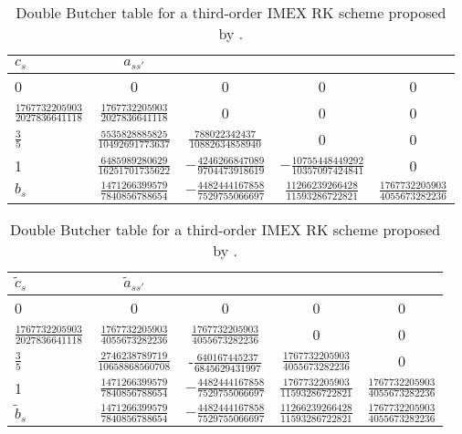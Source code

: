 \begin{table}[t]
\caption{Double Butcher table for a third-order IMEX RK scheme proposed by \cite{kennedy2003additive}.}
\begin{tabular}{lcccc}
\hline
$c_s$ & $a_{ss'}$ & & & \\
\hline
0 & 0 & 0 & 0 & 0 \\
$\frac{1767732205903}{2027836641118}$ & $\frac{1767732205903}{2027836641118}$ & 0 & 0 & 0 \\
$\frac{3}{5}$ & $\frac{5535828885825}{10492691773637}$ & $\frac{788022342437}{10882634858940}$ & 0 & 0 \\
1 & $\frac{6485989280629}{16251701735622}$ & $-\frac{4246266847089}{9704473918619}$ & $-\frac{10755448449292}{10357097424841}$ & 0 \\
\hline
$b_s$ & $\frac{1471266399579}{7840856788654}$ & $-\frac{4482444167858}{7529755066697}$ & $\frac{11266239266428}{11593286722821}$ &  $\frac{1767732205903}{4055673282236}$ \\
\hline
\end{tabular}
\vspace{2cm}
\begin{tabular}{lcccc}
\hline
$\tilde{c}_s$ & $\tilde{a}_{ss'}$ & & & \\
\hline
0 & 0 & 0 & 0 & 0 \\
$\frac{1767732205903}{2027836641118}$ & $\frac{1767732205903}{4055673282236}$ & $\frac{1767732205903}{4055673282236}$ & 0 & 0 \\
$\frac{3}{5}$ & $\frac{2746238789719}{10658868560708}$ & -$\frac{640167445237}{6845629431997}$ & $\frac{1767732205903}{4055673282236}$ & 0 \\
1 & $\frac{1471266399579}{7840856788654}$ & $-\frac{4482444167858}{7529755066697}$ & $\frac{1767732205903}{11593286722821}$ &  $\frac{1767732205903}{4055673282236}$ \\
\hline
$\tilde{b}_s$ & $\frac{1471266399579}{7840856788654}$ & $-\frac{4482444167858}{7529755066697}$ & $\frac{11266239266428}{11593286722821}$ &  $\frac{1767732205903}{4055673282236}$ \\
\end{tabular}
\label{tb:Butcher_tbl_IMEXRK}
\end{table}



